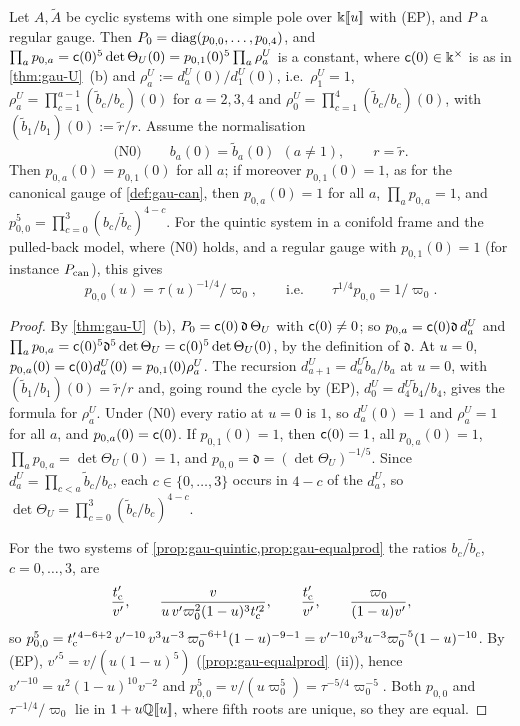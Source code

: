 \begin{lem}
\label{lem:gau-diag}
Let $A,\tilde A$ be cyclic systems with one simple pole over $\Bbbk[\![ u ]\!]$ with (EP), and $P$ a regular gauge. Then $P_0=\operatorname{diag}(p_{0,0},\dots,p_{0,4})$, and $\prod_ap_{0,a}=\mathsf{c}(0)^5\det\Theta_U(0)=p_{0,1}(0)^5\prod_a\rho^U_a$ is a constant, where $\mathsf{c}(0)\in\Bbbk^\times$ is as in \cref{thm:gau-U}~(b) and $\rho^U_a:=d^U_a(0)/d^U_1(0)$, i.e.\ $\rho^U_1=1$, $\rho^U_a=\prod_{c=1}^{a-1}(\tilde b_c/b_c)(0)$ for $a=2,3,4$ and $\rho^U_0=\prod_{c=1}^4(\tilde b_c/b_c)(0)$, with $(\tilde b_1/b_1)(0):=\tilde r/r$. Assume the normalisation
\[
\text{(N0)}\qquad b_a(0)=\tilde b_a(0)\ \ (a\neq1),\qquad r=\tilde r .
\]
Then $p_{0,a}(0)=p_{0,1}(0)$ for all $a$; if moreover $p_{0,1}(0)=1$, as for the canonical gauge of \cref{def:gau-can}, then $p_{0,a}(0)=1$ for all $a$, $\prod_ap_{0,a}=1$, and $p_{0,0}^5=\prod_{c=0}^3(b_c/\tilde b_c)^{4-c}$. For the quintic system in a conifold frame and the pulled-back model, where (N0) holds, and a regular gauge with $p_{0,1}(0)=1$ (for instance $P_{\mathrm{can}}$), this gives
\[
p_{0,0}(u)=\tau(u)^{-1/4}/\varpi_0,\qquad\text{i.e.}\qquad \tau^{1/4}p_{0,0}=1/\varpi_0 .
\]
\end{lem}

\begin{proof}
By \cref{thm:gau-U}~(b), $P_0=\mathsf{c}(0)\,\mathfrak d\,\Theta_U$ with $\mathsf{c}(0)\neq0$; so $p_{0,a}=\mathsf{c}(0)\mathfrak d\,d^U_a$ and $\prod_ap_{0,a}=\mathsf{c}(0)^5\mathfrak d^5\det\Theta_U=\mathsf{c}(0)^5\det\Theta_U(0)$, by the definition of $\mathfrak d$. At $u=0$, $p_{0,a}(0)=\mathsf{c}(0)d^U_a(0)=p_{0,1}(0)\rho^U_a$. The recursion $d^U_{a+1}=d^U_a\tilde b_a/b_a$ at $u=0$, with $(\tilde b_1/b_1)(0)=\tilde r/r$ and, going round the cycle by (EP), $d^U_0=d^U_4\tilde b_4/b_4$, gives the formula for $\rho^U_a$. Under (N0) every ratio at $u=0$ is $1$, so $d^U_a(0)=1$ and $\rho^U_a=1$ for all $a$, and $p_{0,a}(0)=\mathsf{c}(0)$. If $p_{0,1}(0)=1$, then $\mathsf{c}(0)=1$, all $p_{0,a}(0)=1$, $\prod_ap_{0,a}=\det\Theta_U(0)=1$, and $p_{0,0}=\mathfrak d=(\det\Theta_U)^{-1/5}$. Since $d^U_a=\prod_{c<a}\tilde b_c/b_c$, each $c\in\{0,\dots,3\}$ occurs in $4-c$ of the $d^U_a$, so $\det\Theta_U=\prod_{c=0}^3(\tilde b_c/b_c)^{4-c}$.

For the two systems of \cref{prop:gau-quintic,prop:gau-equalprod} the ratios $b_c/\tilde b_c$, $c=0,\dots,3$, are
\[
\frac{t_{\mathrm{c}}'}{v'},\qquad \frac{v}{u\,v'\varpi_0^2(1-u)^3t_{\mathrm{c}}'^2},\qquad\frac{t_{\mathrm{c}}'}{v'},\qquad\frac{\varpi_0}{(1-u)v'},
\]
so $p_{0,0}^5=t_{\mathrm{c}}'^{\,4-6+2}\,v'^{-10}\,v^3u^{-3}\,\varpi_0^{-6+1}(1-u)^{-9-1}=v'^{-10}v^3u^{-3}\varpi_0^{-5}(1-u)^{-10}$. By (EP), $v'^5=v/(u(1-u)^5)$ (\cref{prop:gau-equalprod}~(ii)), hence $v'^{-10}=u^2(1-u)^{10}v^{-2}$ and $p_{0,0}^5=v/(u\varpi_0^5)=\tau^{-5/4}\varpi_0^{-5}$. Both $p_{0,0}$ and $\tau^{-1/4}/\varpi_0$ lie in $1+u\mathbb{Q}[\![ u ]\!]$, where fifth roots are unique, so they are equal.
\end{proof}

